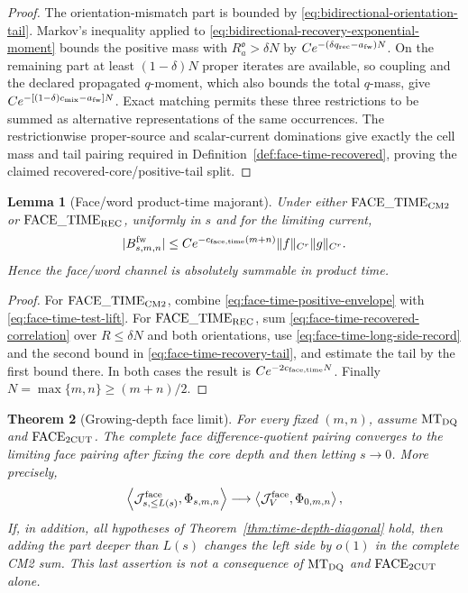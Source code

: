 \documentclass[11pt]{article}
\newtheorem{theorem}{Theorem}[section]
\newtheorem{lemma}[theorem]{Lemma}
\begin{document}
\begin{proof}
The orientation-mismatch part is bounded by
\eqref{eq:bidirectional-orientation-tail}.  Markov's inequality applied to
\eqref{eq:bidirectional-recovery-exponential-moment} bounds the positive
mass with $R_a^{\mathfrak o}>\delta N$ by
$Ce^{-(\delta q_{\rm rec}-a_{\rm fw})N}$.  On the remaining part at least
$(1-\delta)N$ proper iterates are available, so coupling and the declared
propagated $q$-moment, which also bounds the total $q$-mass, give
$Ce^{-[(1-\delta)c_{\rm mix}-a_{\rm fw}]N}$.  Exact matching permits these
three restrictions to be summed as alternative representations of the same
occurrences.  The restrictionwise proper-source and scalar-current
dominations give exactly the cell mass and tail pairing required in
Definition~\ref{def:face-time-recovered}, proving the claimed
recovered-core/positive-tail split.
\end{proof}

\begin{lemma}[Face/word product-time majorant]
\label{lem:face-time-majorant}
Under either $\mathrm{FACE\_TIME}_{\rm CM2}$ or
$\mathrm{FACE\_TIME}_{\rm REC}$, uniformly in $s$ and for the limiting
current,
\begin{equation}
\label{eq:face-time-CM2-majorant}
 |B_{s,m,n}^{\rm fw}|
 \le C e^{-c_{\rm face,time}(m+n)}
 \|f\|_{C^r}\|g\|_{C^r}.
\end{equation}
Hence the face/word channel is absolutely summable in product time.
\end{lemma}

\begin{proof}
For $\mathrm{FACE\_TIME}_{\rm CM2}$, combine
\eqref{eq:face-time-positive-envelope} with
\eqref{eq:face-time-test-lift}.  For
$\mathrm{FACE\_TIME}_{\rm REC}$, sum
\eqref{eq:face-time-recovered-correlation} over $R\le\delta N$ and both
orientations, use \eqref{eq:face-time-long-side-record} and the second bound
in \eqref{eq:face-time-recovery-tail}, and estimate the tail by the first
bound there.  In both cases the result is $Ce^{-2c_{\rm face,time}N}$.
Finally $N=\max\{m,n\}\ge(m+n)/2$.
\end{proof}

\begin{theorem}[Growing-depth face limit]
\label{thm:face-two-cutoff}
For every fixed $(m,n)$, assume $\mathrm{MT}_{\rm DQ}$ and
$\mathrm{FACE}_{\rm 2CUT}$.  The complete face difference-quotient pairing
converges to the limiting face pairing after fixing the core depth and then
letting $s\to0$.  More precisely,
\begin{equation}
\label{eq:face-growing-depth-convergence}
 \left\langle\mathcal J_{s,\le L(s)}^{\rm face},
       \Phi_{s,m,n}\right\rangle
 \longrightarrow
\left\langle\mathcal J_{V}^{\rm face},
       \Phi_{0,m,n}\right\rangle,
\end{equation}
If, in addition, all hypotheses of
Theorem~\ref{thm:time-depth-diagonal} hold, then adding the part deeper than
$L(s)$ changes the left side by $o(1)$ in the complete CM2 sum.  This last
assertion is not a consequence of $\mathrm{MT}_{\rm DQ}$ and
$\mathrm{FACE}_{\rm 2CUT}$ alone.
\end{theorem}
\end{document}
